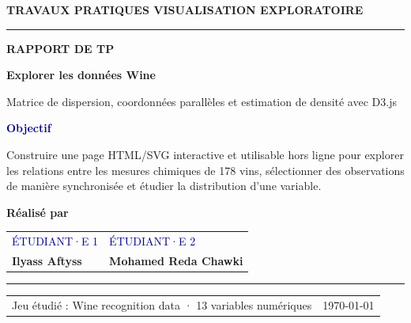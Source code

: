 \documentclass[11pt,a4paper]{article}
\newcommand{\smalltag}[1]{\begingroup\setlength{\fboxsep}{4pt}\colorbox{PaleBlue}{\sffamily\small\textcolor{Navy}{#1}}\endgroup}
\begin{document}
\begin{titlepage}
\thispagestyle{empty}
\vspace*{11mm}
{\sffamily\bfseries\small\color{MatrixBlue} TRAVAUX PRATIQUES \hfill VISUALISATION EXPLORATOIRE}
\par\vspace{7mm}\noindent\color{MatrixBlue}\rule{\textwidth}{1.4pt}
\vspace{17mm}

{\sffamily\bfseries\color{ParallelPurple}\large RAPPORT DE TP}\par
\vspace{4mm}
{\sffamily\bfseries\color{Navy}\fontsize{34}{40}\selectfont Explorer les données Wine}\par
\vspace{5mm}
{\large\color{SoftGray}Matrice de dispersion, coordonnées parallèles et estimation de densité avec D3.js}\par
\vspace{13mm}

\begin{minipage}{.96\textwidth}
\setlength{\fboxsep}{13pt}
\colorbox{PaleBlue}{\parbox{\dimexpr\textwidth-2\fboxsep\relax}{
\sffamily\small\textcolor{Navy}{\textbf{Objectif}}\par
\vspace{2mm}
\normalfont\color{BodyText}Construire une page HTML/SVG interactive et utilisable hors ligne pour explorer les relations entre les mesures chimiques de 178 vins, sélectionner des observations de manière synchronisée et étudier la distribution d'une variable.
}}
\end{minipage}

\vspace{17mm}
{\sffamily\bfseries\color{Navy}\large Réalisé par}\par
\vspace{4mm}
\begin{tabularx}{.86\textwidth}{@{}X X@{}}
\smalltag{ÉTUDIANT·E 1} & \smalltag{ÉTUDIANT·E 2} \\
\textbf{Ilyass Aftyss} & \textbf{Mohamed Reda Chawki}
\end{tabularx}

\vfill
\noindent\color{RuleGray}\rule{\textwidth}{0.6pt}\par
\vspace{3mm}
\begin{tabularx}{\textwidth}{@{}X r@{}}
\small\sffamily\color{SoftGray}Jeu étudié : Wine recognition data · 13 variables numériques & \small\sffamily\color{SoftGray}\today
\end{tabularx}
\end{titlepage}
\end{document}
